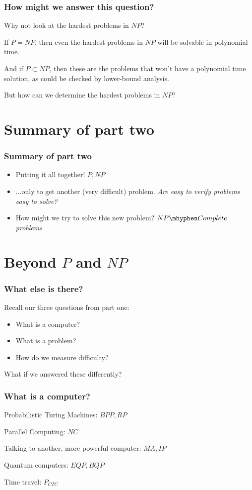 \documentclass[aspectratio=169]{beamer}
\begin{document}
\begin{frame}
\frametitle{How might we answer this question?}

Why not look at the hardest problems in $NP$?

If $P = NP$, then even the hardest problems in $NP$ will be solvable in polynomial time.

And if $P \subset NP$, then these are the problems that won't have a polynomial time solution, as could be checked by lower-bound analysis.

But how can we determine the hardest problems in $NP$?
\end{frame}

\section{Summary of part two}

\begin{frame}
\frametitle{Summary of part two}
\begin{itemize}
    \item Putting it all together! {\em $P, NP$}
    \item ...only to get another (very difficult) problem. {\em Are easy to verify problems easy to solve?}
    \item How might we try to solve this new problem? {\em $NP\mhyphen Complete$ problems}
\end{itemize}
\end{frame}

\section{Beyond $P$ and $NP$}

\begin{frame}
\frametitle{What else is there?}
Recall our three questions from part one:
\begin{itemize}
    \item What is a computer?
    \item What is a problem?
    \item How do we measure difficulty?
\end{itemize}
What if we answered these differently?
\end{frame}

\begin{frame}
\frametitle{What is a computer?}
Probabilistic Turing Machines: $BPP, RP$

Parallel Computing: $NC$

Talking to another, more powerful computer: $MA, IP$

Quantum computers:  $EQP, BQP$

Time travel: $P_{CTC}$
\end{frame}
\end{document}
